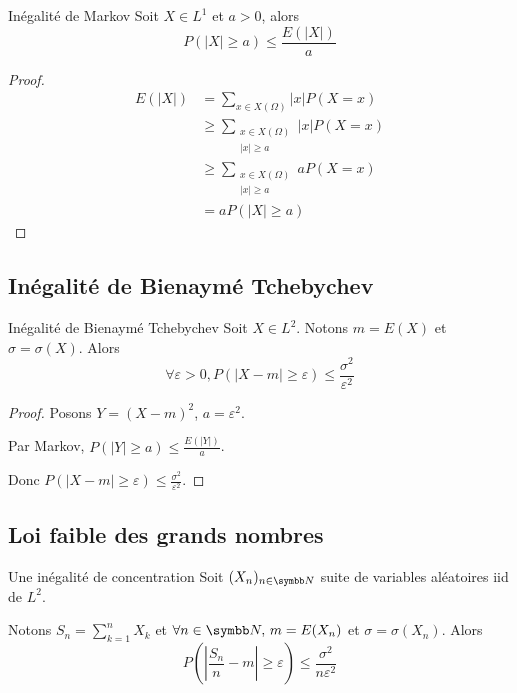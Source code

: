 \begin{proposition}{Inégalité de Markov}{}
    Soit $X \in L^1$ et $a > 0$, alors 
    $$ P(|X| \geqslant a) \leqslant \frac{E(|X|)}{a} $$
\end{proposition}

\begin{proof}
    \begin{align}
        E(|X|) & = \sum_{x \in X(\Omega)} |x| P(X = x) \\
        & \geqslant \sum_{\substack{x \in X(\Omega) \\ |x| \geqslant a}} |x| P(X = x) \\
        & \geqslant \sum_{\substack{x \in X(\Omega) \\ |x| \geqslant a}} a P(X = x) \\
        & = a P(|X| \geqslant a)
    \end{align}
\end{proof}

\subsection{Inégalité de Bienaymé Tchebychev}

\begin{theoreme}{Inégalité de Bienaymé Tchebychev}{}
    Soit $X \in L^2$. Notons $m = E(X)$ et $\sigma = \sigma(X)$.
    Alors $$\forall \varepsilon > 0, P(|X - m| \geqslant \varepsilon) \leqslant \frac{\sigma^2}{\varepsilon^2}$$
\end{theoreme}

\begin{proof}
    Posons $Y = (X - m)^2$, $a = \varepsilon^2$.

    Par Markov, $P(|Y| \geqslant a) \leqslant \frac{E(|Y|)}{a}$.

    Donc $P(|X - m| \geqslant \varepsilon) \leqslant \frac{\sigma^2}{\varepsilon^2}$.
\end{proof}

\subsection{Loi faible des grands nombres }

\begin{proposition}{Une inégalité de concentration}{}
    Soit $(X_n)_{n \in \N}$ suite de variables aléatoires iid de $L^2$. 

    Notons $\displaystyle S_n = \sum_{k = 1 }^{n } X_k$ et $\forall n \in \N, \, m = E(X_n)$ et $\sigma = \sigma(X_n)$.
    Alors $$P\left( \left| \frac{S_n}{n} - m \right| \geqslant \varepsilon \right) \leqslant \frac{\sigma^2}{n \varepsilon^2}$$
\end{proposition}

